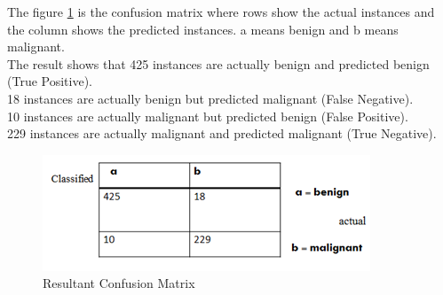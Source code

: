 \documentclass[conference]{IEEEtran}
\begin{document}
 The figure \ref{fig_confusion} is the confusion matrix where rows show the actual instances and the column shows the predicted instances. a means benign and b means malignant. \\The result shows that
 425 instances are actually benign and predicted benign (True Positive).
\\18 instances are actually benign but predicted malignant (False Negative).
\\10 instances are actually malignant but predicted benign (False Positive).
\\229 instances are actually malignant and predicted malignant (True Negative).

\begin{figure}[!h]
\centering
\includegraphics[scale=0.9]{confusionnew}
\caption{Resultant Confusion Matrix}
\label{fig_confusion}
\end{figure}

%
%

\end{document}
